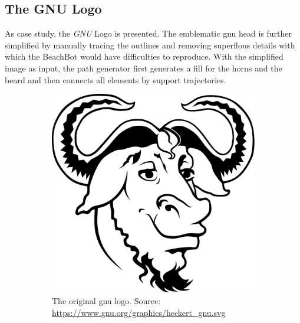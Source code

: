\clearpage
\subsection{The GNU Logo}

As case study, the \textit{GNU} Logo is presented. The emblematic gnu head is further simplified by manually tracing the outlines and removing superflous details with which the BeachBot would have difficulties to reproduce. With the simplified image as input, the path generator first generates a fill for the horns and the beard and then connects all elements by support trajectories.

\begin{figure}[h]
\centering
\begin{subfigure}[t]{0.45\textwidth}
\centering
	\includegraphics[width=\textwidth]{images/results/gnu/logo.pdf}
	\caption{The original gnu logo. Source: \url{https://www.gnu.org/graphics/heckert_gnu.svg}}
\end{subfigure}~
\begin{subfigure}[t]{0.45\textwidth}
\centering

\end{subfigure}
\end{figure}
